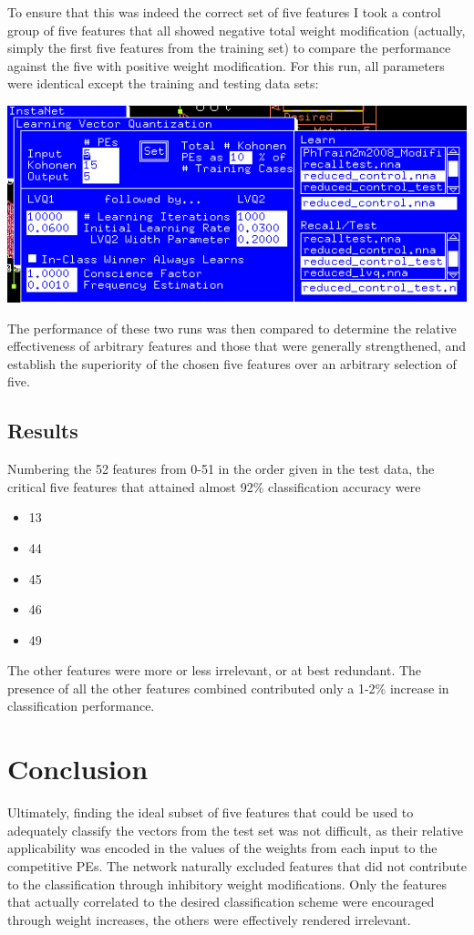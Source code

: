 \documentclass[12pt]{article}
\begin{document}
To ensure that this was indeed the correct set of five features I took a control group of five features that all showed negative total weight modification (actually, simply the first five features from the training set) to compare the performance against the five with positive weight modification.  For this run, all parameters were identical except the training and testing data sets:

\begin{center}
\includegraphics[scale=0.7]{parameters5control.png}
\end{center}

The performance of these two runs was then compared to determine the relative effectiveness of arbitrary features and those that were generally strengthened, and establish the superiority of the chosen five features over an arbitrary selection of five.  

\subsection{Results}

Numbering the 52 features from 0-51 in the order given in the test data, the critical five features that attained almost 92\% classification accuracy were

\begin{itemize}
\item 13
\item 44
\item 45
\item 46
\item 49
\end{itemize}

The other features were more or less irrelevant, or at best redundant.  The presence of all the other features combined contributed only a 1-2\% increase in classification performance.

\section{Conclusion}

Ultimately, finding the ideal subset of five features that could be used to adequately classify the vectors from the test set was not difficult, as their relative applicability was encoded in the values of the weights from each input to the competitive PEs.  The network naturally excluded features that did not contribute to the classification through inhibitory weight modifications.  Only the features that actually correlated to the desired classification scheme were encouraged through weight increases, the others were effectively rendered irrelevant.  
\end{document}
